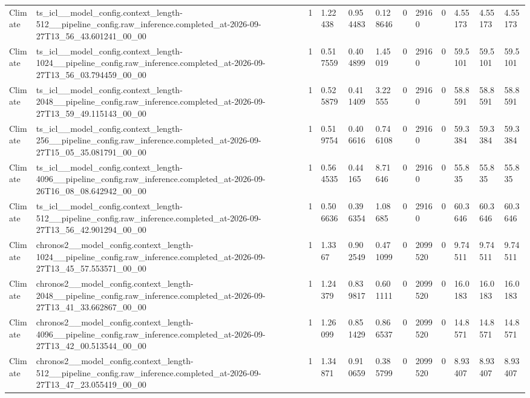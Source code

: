 \begin{tabular}{llllllllllll}
Climate & ts\_icl\_\_model\_config.context\_length-512\_\_pipeline\_config.raw\_inference.completed\_at-2026-09-27T13\_56\_43.601241\_00\_00 & 1 & 1.22438 & 0.954483 & 0.128646 & 0 & 29160 & 0 & 4.55173 & 4.55173 & 4.55173 \\
Climate & ts\_icl\_\_model\_config.context\_length-1024\_\_pipeline\_config.raw\_inference.completed\_at-2026-09-27T13\_56\_03.794459\_00\_00 & 1 & 0.517559 & 0.404899 & 1.45019 & 0 & 29160 & 0 & 59.5101 & 59.5101 & 59.5101 \\
Climate & ts\_icl\_\_model\_config.context\_length-2048\_\_pipeline\_config.raw\_inference.completed\_at-2026-09-27T13\_59\_49.115143\_00\_00 & 1 & 0.525879 & 0.411409 & 3.22555 & 0 & 29160 & 0 & 58.8591 & 58.8591 & 58.8591 \\
Climate & ts\_icl\_\_model\_config.context\_length-256\_\_pipeline\_config.raw\_inference.completed\_at-2026-09-27T15\_05\_35.081791\_00\_00 & 1 & 0.519754 & 0.406616 & 0.746108 & 0 & 29160 & 0 & 59.3384 & 59.3384 & 59.3384 \\
Climate & ts\_icl\_\_model\_config.context\_length-4096\_\_pipeline\_config.raw\_inference.completed\_at-2026-09-26T16\_08\_08.642942\_00\_00 & 1 & 0.564535 & 0.44165 & 8.71646 & 0 & 29160 & 0 & 55.835 & 55.835 & 55.835 \\
Climate & ts\_icl\_\_model\_config.context\_length-512\_\_pipeline\_config.raw\_inference.completed\_at-2026-09-27T13\_56\_42.901294\_00\_00 & 1 & 0.506636 & 0.396354 & 1.08685 & 0 & 29160 & 0 & 60.3646 & 60.3646 & 60.3646 \\
Climate & chronos2\_\_model\_config.context\_length-1024\_\_pipeline\_config.raw\_inference.completed\_at-2026-09-27T13\_45\_57.553571\_00\_00 & 1 & 1.3367 & 0.902549 & 0.471099 & 0 & 2099520 & 0 & 9.74511 & 9.74511 & 9.74511 \\
Climate & chronos2\_\_model\_config.context\_length-2048\_\_pipeline\_config.raw\_inference.completed\_at-2026-09-27T13\_41\_33.662867\_00\_00 & 1 & 1.24379 & 0.839817 & 0.601111 & 0 & 2099520 & 0 & 16.0183 & 16.0183 & 16.0183 \\
Climate & chronos2\_\_model\_config.context\_length-4096\_\_pipeline\_config.raw\_inference.completed\_at-2026-09-27T13\_42\_00.513544\_00\_00 & 1 & 1.26099 & 0.851429 & 0.866537 & 0 & 2099520 & 0 & 14.8571 & 14.8571 & 14.8571 \\
Climate & chronos2\_\_model\_config.context\_length-512\_\_pipeline\_config.raw\_inference.completed\_at-2026-09-27T13\_47\_23.055419\_00\_00 & 1 & 1.34871 & 0.910659 & 0.385799 & 0 & 2099520 & 0 & 8.93407 & 8.93407 & 8.93407 \\

\end{tabular}
